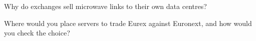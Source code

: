 \begin{interviewq}\label{iq:nw:the-european-map:5}
Why do exchanges sell microwave links to their own data centres?
\end{interviewq}

\begin{interviewq}\label{iq:nw:the-european-map:6}
Where would you place servers to trade Eurex against Euronext, and how would you check the choice?
\end{interviewq}
